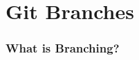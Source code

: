 
\section[Branching]{Git Branches}

\begin{frame}
\frametitle{\large What is Branching?}
\end{frame}